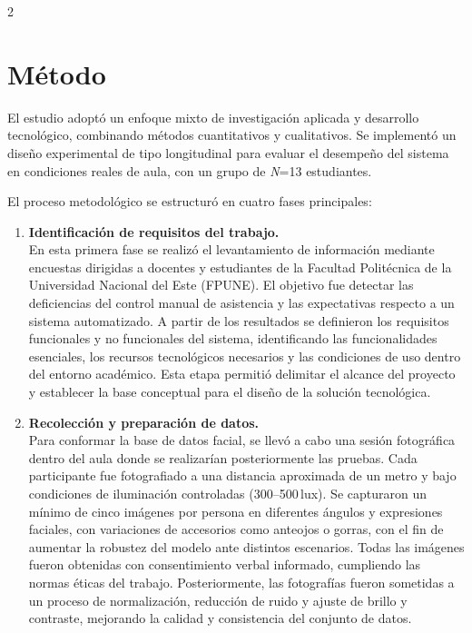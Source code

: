\documentclass[10pt,a4paper]{article}
\begin{document}
\begin{multicols}{2}
\section{Método}

El estudio adoptó un enfoque mixto de investigación aplicada y desarrollo tecnológico, combinando métodos cuantitativos y cualitativos. Se implementó un diseño experimental de tipo longitudinal para evaluar el desempeño del sistema en condiciones reales de aula, con un grupo de \textit{N}=13 estudiantes.  

El proceso metodológico se estructuró en cuatro fases principales:

\begin{enumerate}
    \item \textbf{Identificación de requisitos del trabajo.} \\
    En esta primera fase se realizó el levantamiento de información mediante encuestas dirigidas a docentes y estudiantes de la Facultad Politécnica de la Universidad Nacional del Este (FPUNE).  
    El objetivo fue detectar las deficiencias del control manual de asistencia y las expectativas respecto a un sistema automatizado.  
    A partir de los resultados se definieron los requisitos funcionales y no funcionales del sistema, identificando las funcionalidades esenciales, los recursos tecnológicos necesarios y las condiciones de uso dentro del entorno académico.  
    Esta etapa permitió delimitar el alcance del proyecto y establecer la base conceptual para el diseño de la solución tecnológica.

    \item \textbf{Recolección y preparación de datos.} \\
    Para conformar la base de datos facial, se llevó a cabo una sesión fotográfica dentro del aula donde se realizarían posteriormente las pruebas.  
    Cada participante fue fotografiado a una distancia aproximada de un metro y bajo condiciones de iluminación controladas (300–500\,lux).  
    Se capturaron un mínimo de cinco imágenes por persona en diferentes ángulos y expresiones faciales, con variaciones de accesorios como anteojos o gorras, con el fin de aumentar la robustez del modelo ante distintos escenarios.  
    Todas las imágenes fueron obtenidas con consentimiento verbal informado, cumpliendo las normas éticas del trabajo.  
    Posteriormente, las fotografías fueron sometidas a un proceso de normalización, reducción de ruido y ajuste de brillo y contraste, mejorando la calidad y consistencia del conjunto de datos.


\end{enumerate}
\end{multicols}
\end{document}
